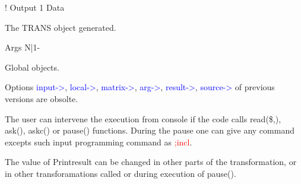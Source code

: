 !
\vspace{0.3cm}
\hline
\vspace{0.3cm}
\noindent Output \tabto{3cm} 1 \tabto{5cm}  Data \tabto{7cm}
\begin{changemargin}{3cm}{0cm}
\noindent The TRANS object generated.
\end{changemargin}
\vspace{0.3cm}
\hline
\vspace{0.3cm}
\noindent Args \tabto{3cm} N|1- \tabto{5cm}    \tabto{7cm}
\begin{changemargin}{3cm}{0cm}
\noindent  Global objects.
\end {changemargin}
\hline
\vspace{0.2cm}
\begin{note}
Options \textcolor{blue}{input->}, \textcolor{blue}{local->}, \textcolor{blue}{matrix->}, \textcolor{blue}{arg->}, \textcolor{blue}{result->}, \textcolor{blue}{source->} of previous
versions are obsolte.
\end{note}
\begin{note}
The user can intervene the execution from console if the code calls \textcolor{VioletRed}{read}(\$,),
\textcolor{VioletRed}{ask}(), \textcolor{VioletRed}{askc}() or \textcolor{VioletRed}{pause}() functions. During the pause one can give any command excepts
such input programming command as \textcolor{Red}{;incl}.
\end{note}
\begin{note}
The value of Printresult can be changed in other parts of the transformation, or
in other transforamations called or during execution of \textcolor{VioletRed}{pause}().
\end{note}

